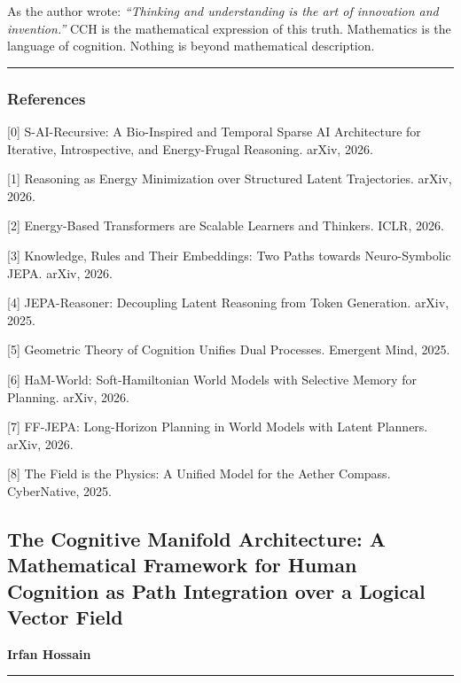 \documentclass[
  11pt,
  a4paper,
]{article}
\begin{document}
As the author wrote: \emph{``Thinking and understanding is the art of
innovation and invention.''} CCH is the mathematical expression of this
truth. Mathematics is the language of cognition. Nothing is beyond
mathematical description.

\begin{center}\rule{0.5\linewidth}{0.5pt}\end{center}

\subsubsection{References}\label{references-1}

{[}0{]} S-AI-Recursive: A Bio-Inspired and Temporal Sparse AI
Architecture for Iterative, Introspective, and Energy-Frugal Reasoning.
arXiv, 2026.

{[}1{]} Reasoning as Energy Minimization over Structured Latent
Trajectories. arXiv, 2026.

{[}2{]} Energy-Based Transformers are Scalable Learners and Thinkers.
ICLR, 2026.

{[}3{]} Knowledge, Rules and Their Embeddings: Two Paths towards
Neuro-Symbolic JEPA. arXiv, 2026.

{[}4{]} JEPA-Reasoner: Decoupling Latent Reasoning from Token
Generation. arXiv, 2025.

{[}5{]} Geometric Theory of Cognition Unifies Dual Processes. Emergent
Mind, 2025.

{[}6{]} HaM-World: Soft-Hamiltonian World Models with Selective Memory
for Planning. arXiv, 2026.

{[}7{]} FF-JEPA: Long-Horizon Planning in World Models with Latent
Planners. arXiv, 2026.

{[}8{]} The Field is the Physics: A Unified Model for the Aether
Compass. CyberNative, 2025.

\newpage

\subsection{The Cognitive Manifold Architecture: A Mathematical
Framework for Human Cognition as Path Integration over a Logical Vector
Field}\label{the-cognitive-manifold-architecture-a-mathematical-framework-for-human-cognition-as-path-integration-over-a-logical-vector-field}

\textbf{Irfan Hossain}

\begin{center}\rule{0.5\linewidth}{0.5pt}\end{center}
\end{document}

